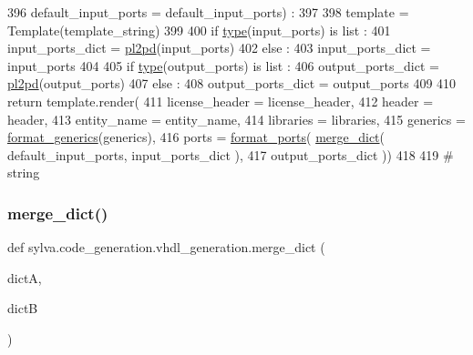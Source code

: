\begin{DoxyCode}
396   default\_input\_ports = default\_input\_ports) :
397 
398   template = Template(template\_string)
399 
400   \textcolor{keywordflow}{if} \hyperlink{namespacesylva_1_1misc_1_1exec_a55d55e6d0e68715dfbd883034bd7290c}{type}(input\_ports) \textcolor{keywordflow}{is} list :
401     input\_ports\_dict = \hyperlink{namespacesylva_1_1code__generation_1_1vhdl__generation_a10ea31d6ea98aa308e635b9403f5721f}{pl2pd}(input\_ports)
402   \textcolor{keywordflow}{else} :
403     input\_ports\_dict = input\_ports
404 
405   \textcolor{keywordflow}{if} \hyperlink{namespacesylva_1_1misc_1_1exec_a55d55e6d0e68715dfbd883034bd7290c}{type}(output\_ports) \textcolor{keywordflow}{is} list :
406     output\_ports\_dict = \hyperlink{namespacesylva_1_1code__generation_1_1vhdl__generation_a10ea31d6ea98aa308e635b9403f5721f}{pl2pd}(output\_ports)
407   \textcolor{keywordflow}{else} :
408     output\_ports\_dict = output\_ports
409 
410   \textcolor{keywordflow}{return} template.render(
411     license\_header = license\_header,
412     header = header,
413     entity\_name = entity\_name,
414     libraries = libraries,
415     generics = \hyperlink{namespacesylva_1_1code__generation_1_1vhdl__generation_a94dd1f9bcf57913f20c5a8235e04c3c6}{format\_generics}(generics),
416     ports = \hyperlink{namespacesylva_1_1code__generation_1_1vhdl__generation_ac44fef3535243add66477e8198d8b0a5}{format\_ports}( \hyperlink{namespacesylva_1_1code__generation_1_1vhdl__generation_a6f105e19192ce75934f22be90308ceff}{merge\_dict}( default\_input\_ports, input\_ports\_dict ),
417       output\_ports\_dict ))
418 
419 \textcolor{comment}{# string}
\end{DoxyCode}
\mbox{\label{namespacesylva_1_1code__generation_1_1vhdl__generation_a6f105e19192ce75934f22be90308ceff}} 
\subsubsection{\texorpdfstring{merge\+\_\+dict()}{merge\_dict()}}
{\footnotesize\ttfamily def sylva.\+code\+\_\+generation.\+vhdl\+\_\+generation.\+merge\+\_\+dict (\begin{DoxyParamCaption}\item[{}]{dictA,  }\item[{}]{dictB }\end{DoxyParamCaption})}




